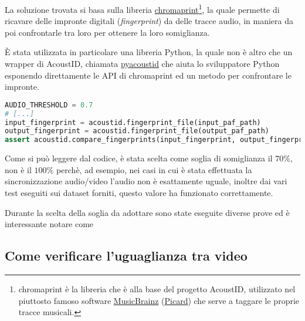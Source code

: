La soluzione trovata si basa sulla libreria \href{https://acoustid.org/chromaprint}{chromaprint}\footnote{chromaprint è la libreria che è alla base del progetto AcoustID, utilizzato nel piuttosto famoso software \href{https://musicbrainz.org/}{MusicBrainz} (\href{https://picard.musicbrainz.org/}{Picard}) che serve a taggare le proprie tracce musicali.}, la quale permette di ricavare delle impronte digitali (\textit{fingerprint}) da delle tracce audio, in maniera da poi confrontarle tra loro per ottenere la loro somiglianza.    %

È stata utilizzata in particolare una libreria Python, la quale non è altro che un wrapper di AcoustID, chiamata \href{https://github.com/beetbox/pyacoustid}{pyacoustid} che aiuta lo sviluppatore Python esponendo direttamente le API di chromaprint ed un metodo per confrontare le impronte.

\begin{lstlisting}[language=Python, caption=Test di comparazione di due file audio tramite la loro impronta digitale]
AUDIO_THRESHOLD = 0.7
# [...]
input_fingerprint = acoustid.fingerprint_file(input_paf_path)
output_fingerprint = acoustid.fingerprint_file(output_paf_path)
assert acoustid.compare_fingerprints(input_fingerprint, output_fingerprint) > AUDIO_THRESHOLD, "PreservationAudioFile.wav is not the same as input"
\end{lstlisting}

Come si può leggere dal codice, è stata scelta come soglia di somiglianza il $70\%$, non è il $100\%$ perchè, ad esempio, nei casi in cui è stata effettuata la sincronizzazione audio/video l'audio non è esattamente uguale, inoltre dai vari test eseguiti sui dataset forniti, questo valore ha funzionato correttamente.

Durante la scelta della soglia da adottare sono state eseguite diverse prove ed è interessante notare come













\subsection{Come verificare l'uguaglianza tra video}  %
